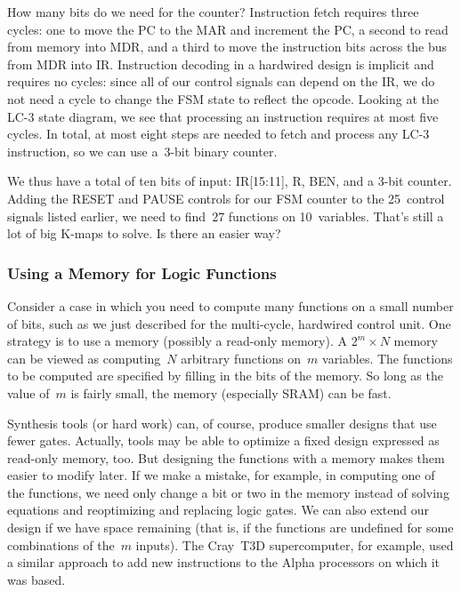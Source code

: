 How many bits do we need for the counter?
Instruction fetch requires three cycles: one to move
the PC to the MAR and increment the PC, a second to read from
memory into MDR, and a third to move the instruction bits across
the bus from MDR into IR.  Instruction decoding in a hardwired design
is implicit and 
requires no cycles: since all of our control signals can depend on
the IR, we do not need a cycle to change the FSM state to reflect the opcode.
Looking at the \mbox{LC-3} state diagram, we see
that processing an instruction requires at most five cycles.  In
total, at
most eight steps are needed to fetch and process any \mbox{LC-3} 
instruction, so we can use a~\mbox{3-bit} binary counter.

We thus have a total of ten bits of input: IR[15:11], R, BEN, and
a \mbox{3-bit} counter.
%
Adding the RESET and PAUSE controls for our FSM counter to the 
25~control signals listed earlier, we need to find~27 functions
on 10~variables.
%
That's still a lot of big \mbox{K-maps} to solve.  Is there an
easier way?\\


\subsubsection{Using a Memory for Logic Functions}

Consider a case in which you need to compute many functions on a small 
number of bits, such as we just described for the multi-cycle, hardwired
control unit.  One strategy is to use a memory (possibly a read-only memory).
A \mbox{$2^m\times{N}$} memory can be viewed as computing~$N$ arbitrary
functions on~$m$ variables.  The functions to be computed are specified
by filling in the bits of the memory.  So long as the value of~$m$ is fairly
small, the memory (especially SRAM) can be fast.

Synthesis tools (or hard work) can, of course, produce smaller designs
that use fewer gates.  Actually, tools may be able to optimize a fixed
design expressed as read-only memory, too.  But designing the functions
with a memory makes them easier to modify later.  If we make a mistake,
for example, in computing one of the functions, we need only change a bit
or two in the memory instead of solving equations and reoptimizing and
replacing logic gates.  We can also extend our design if we have space
remaining (that is, if the functions are undefined for some combinations 
of the~$m$ inputs).  The
Cray~T3D supercomputer, for example, used a similar approach to add
new instructions to the Alpha processors on which it was based.

